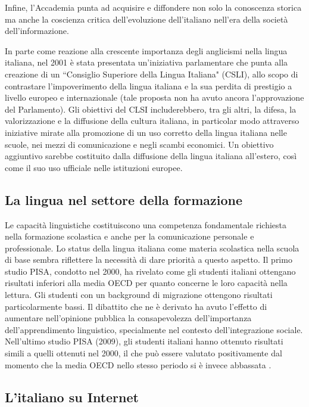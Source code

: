 \begin{multicols}{2}
Infine, l'Accademia
punta ad acquisire e diffondere non solo la conoscenza storica ma anche la
coscienza critica dell'evoluzione dell'italiano nell'era della societ\`{a}
dell'informazione.

In parte come reazione alla crescente importanza degli anglicismi nella lingua
italiana, nel 2001 \`{e} stata presentata un'iniziativa parlamentare che punta
alla creazione di un “Consiglio Superiore della Lingua Italiana" (CSLI), allo
scopo di contrastare l'impoverimento della lingua italiana e la sua perdita di
prestigio a livello europeo e internazionale (tale proposta non ha avuto
ancora l'approvazione del Parlamento). Gli obiettivi del CLSI includerebbero,
tra gli altri, la difesa, la valorizzazione e la diffusione della cultura
italiana, in particolar modo attraverso iniziative mirate alla promozione di
un uso corretto della lingua italiana nelle scuole, nei mezzi di comunicazione
e negli scambi economici. Un obiettivo aggiuntivo sarebbe costituito dalla
diffusione della lingua italiana all'estero, cos\`{i} come il suo uso
ufficiale nelle istituzioni europee.

\subsection{La lingua nel settore della formazione}

Le capacit\`{a} linguistiche costituiscono una competenza fondamentale
richiesta nella formazione scolastica e anche per la comunicazione personale e
professionale. Lo status della lingua italiana come materia scolastica nella
scuola di base sembra riflettere la necessit\`{a} di dare priorit\`{a} a
questo aspetto.
Il primo studio PISA, condotto nel 2000, ha rivelato come gli studenti
italiani ottengano risultati inferiori alla media OECD per quanto concerne le
loro capacit\`{a} nella lettura. Gli studenti con un background di migrazione
ottengono risultati particolarmente bassi. Il dibattito che ne \`{e} derivato
ha avuto l'effetto di aumentare nell'opinione pubblica la consapevolezza
dell'importanza dell'apprendimento linguistico, specialmente nel contesto
dell'integrazione sociale. Nell'ultimo studio PISA (2009), gli studenti
italiani hanno ottenuto risultati simili a quelli ottenuti nel 2000, il che
pu\`{o} essere valutato positivamente dal momento che la media OECD nello
stesso periodo si \`{e} invece abbassata \cite{Pisa1}.

\subsection{L'italiano su Internet}


\end{multicols}
